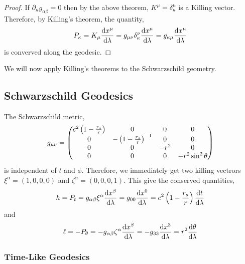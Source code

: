\documentclass[11pt, a4paper]{article}
\begin{document}
\begin{proof}
If $\partial_{\kappa} g_{\alpha \beta} = 0$ then by the above theorem, $K^\mu = \delta^{\mu}_{\kappa}$ is a Killing vector. Therefore, by Killing's theorem, the quantity,
\[ P_\kappa = K_{\mu} \frac{\mathrm{d}x^{\mu}}{\mathrm{d}\lambda} = g_{\mu \nu} \delta^{\nu}_{\kappa} \frac{\mathrm{d}x^{\mu}}{\mathrm{d}\lambda} = g_{\kappa \mu} \frac{\mathrm{d}x^{\mu}}{\mathrm{d}\lambda}\]
is converved along the geodesic.
\end{proof}

We will now apply Killing's theorems to the Schwarzschild geometry.

\subsection{Schwarzschild Geodesics}
The Schwarzschild metric,
\[ g_{\mu \nu}
= 
\begin{pmatrix}
c^2 \left(1 - \frac{r_s}{r} \right) & 0 & 0 & 0 \\
0 & - \left(1 - \frac{r_s}{r} \right)^{-1} & 0 & 0 \\
0 & 0 & - r^2 & 0 \\
0 & 0 & 0 & - r^2 \sin^2{\theta}
\end{pmatrix}
\]
is independent of $t$ and $\phi$. Therefore, we immediately get two killing vectrors $\xi^\alpha = (1, 0, 0, 0)$ and $\zeta^\alpha = (0, 0, 0, 1)$. This give the conserved quantities,
\[ h = P_t = g_{\alpha \beta} \xi^\alpha \frac{\mathrm{d}x^\beta}{\mathrm{d}\lambda} = g_{0 0} \frac{\mathrm{d}x^0}{\mathrm{d}\lambda} = c^2 \left(1 - \frac{r_s}{r} \right) \frac{\mathrm{d}t}{\mathrm{d}\lambda} \]
and 
\[ \ell = - P_\theta = - g_{\alpha \beta} \zeta^\alpha \frac{\mathrm{d}x^\beta}{\mathrm{d}\lambda} = - g_{3 3} \frac{\mathrm{d}x^3}{\mathrm{d}\lambda} = r^2 \frac{\mathrm{d}\theta}{\mathrm{d}\lambda} \]

\subsubsection{Time-Like Geodesics}
\end{document}
